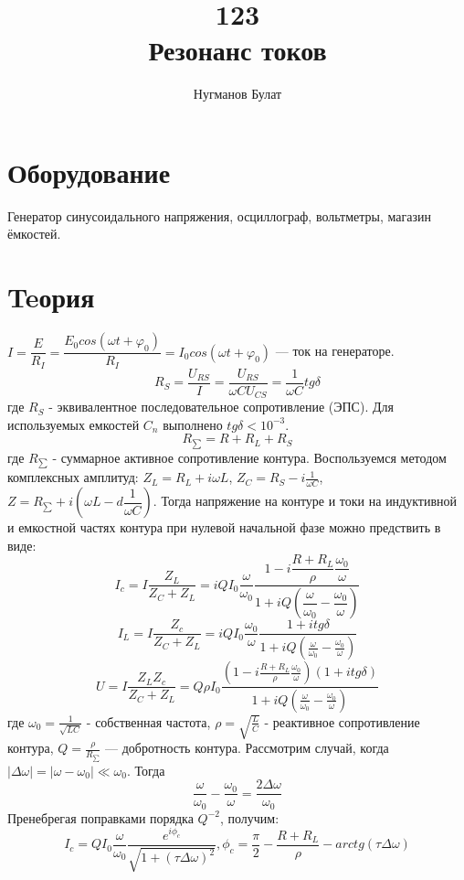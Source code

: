 \documentclass[a4paper, 12pt]{article}%
\author{Нугманов Булат}
\title{ 123 \\ Резонанс токов}
\begin{document}
\maketitle

\section*{Оборудование}
Генератор синусоидального напряжения, осциллограф, вольтметры, магазин ёмкостей.
\section*{Teория}
$I=\dfrac{E}{R_I}=\dfrac{E_0cos(\omega t+\varphi_0)}{R_I}=I_0cos(\omega t+\varphi_0)$ --- ток на генераторе.\newline
$$R_S=\dfrac{U_{RS}}{I}=\frac{U_{RS}}{\omega CU_{CS}}=\dfrac{1}{\omega C}tg\delta$$
где $R_S$ - эквивалентное последовательное сопротивление (ЭПС).\newline
Для используемых емкостей $C_n$ выполнено $tg\delta<10^{-3}$.\newline
$$R_{\sum}=R+R_L+R_S$$
где $R_{\sum}$ - суммарное активное сопротивление контура.\newline
Воспользуемся методом комплексных амплитуд:\newline
$Z_L=R_L+i\omega L$, $Z_C=R_S-i\frac{1}{\omega C}$, $Z=R_{\sum}+i(\omega L-d\dfrac{1}{\omega C})$.\newline
Тогда напряжение на контуре и токи на индуктивной и емкостной частях контура при нулевой начальной фазе можно предствить в виде:\newline
$$I_c=I\dfrac{Z_L}{Z_C+Z_L}=iQI_0\dfrac{\omega}{\omega_0}\dfrac{1-i\dfrac{R+R_L}{\rho}\dfrac{\omega_0}{\omega}}{1+iQ(\dfrac{\omega}{\omega_0}-\dfrac{\omega_0}{\omega})}$$
$$I_L=I\dfrac{Z_c}{Z_C+Z_L}=iQI_0\frac{\omega_0}{\omega}\frac{1+itg\delta}{1+iQ(\frac{\omega}{\omega_0}-\frac{\omega_0}{\omega})}$$
$$U=I\frac{Z_LZ_c}{Z_C+Z_L}=Q\rho I_0\frac{(1-i\frac{R+R_L}{\rho}\frac{\omega_0}{\omega})(1+itg\delta)}{1+iQ(\frac{\omega}{\omega_0}-\frac{\omega_0}{\omega})}$$
где $\omega_0=\frac{1}{\sqrt{LC}}$ - собственная частота, $\rho=\sqrt{\frac{L}{C}}$ - реактивное сопротивление контура, $Q=\frac{\rho} {R_{\sum}}$ --- добротность контура.\newline
Рассмотрим случай, когда $|\Delta\omega|=|\omega-\omega_0|\ll\omega_0$. Тогда
$$\frac{\omega}{\omega_0}-\frac{\omega_0}{\omega}=\frac{2\Delta\omega}{\omega_0}$$
Пренебрегая поправками порядка $Q^{-2}$, получим:
$$I_c=QI_0\frac{\omega}{\omega_0}\frac{e^{i\phi_c}}{\sqrt{1+(\tau\Delta\omega)^2}},    \phi_c=\frac{\pi}{2}-\frac{R+R_L}{\rho}-arctg(\tau\Delta\omega)$$
\end{document}
